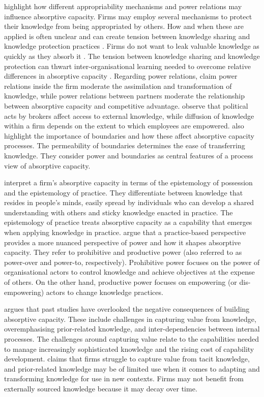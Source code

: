 \citet{todorova2007absorptive} highlight how different appropriability mechanisms and power relations may influence absorptive capacity.  Firms may employ several mechanisms to protect their knowledge from being appropriated by others. How and when these are applied is often unclear and can create tension between knowledge sharing and knowledge protection practices \citep{gama2019managing}. Firms do not want to leak valuable knowledge as quickly as they absorb it \citep{todorova2007absorptive}. The tension between knowledge sharing and knowledge protection can thwart inter-organisational learning needed to overcome relative differences in absorptive capacity \citep{dragsdahl2019perspective,gama2019managing}. Regarding power relations, \citet{todorova2007absorptive} claim power relations inside the firm moderate the assimilation and transformation of knowledge, while power relations between partners moderate the relationship between absorptive capacity and competitive advantage.  \citet{easterby2008absorptive} observe that political acts by brokers affect access to external knowledge, while diffusion of knowledge within a firm depends on the extent to which employees are empowered. \citet{easterby2008absorptive} also highlight the importance of boundaries and how these affect absorptive capacity processes. The permeability of boundaries determines the ease of transferring knowledge. They consider power and boundaries as central features of a process view of absorptive capacity. \medskip

\citet{marabelli2014knowing} interpret a firm's absorptive capacity in terms of the epistemology of possession and the epistemology of practice. They differentiate between knowledge that resides in people's minds, easily spread by individuals who can develop a shared understanding with others and sticky knowledge enacted in practice. The epistemology of practice treats absorptive capacity as a capability that emerges when applying knowledge in practice. \citet{marabelli2014knowing} argue that a practice-based perspective provides a more nuanced perspective of power and how it shapes absorptive capacity. They refer to prohibitive and productive power (also referred to as power-over and power-to, respectively). Prohibitive power focuses on the power of organisational actors to control knowledge and achieve objectives at the expense of others. On the other hand, productive power focuses on empowering (or dis-empowering) actors to change knowledge practices. \medskip

\citet {lichtenthaler2016absorptive} argues that past studies have overlooked the negative consequences of building absorptive capacity. These include challenges in capturing value from knowledge, overemphasising prior-related knowledge, and inter-dependencies between internal processes. The challenges around capturing value relate to the capabilities needed to manage increasingly sophisticated knowledge and the rising cost of capability development. \citet{lichtenthaler2016absorptive} claims that firms struggle to capture value from tacit knowledge, and prior-related knowledge may be of limited use when it comes to adapting and transforming knowledge for use in new contexts. Firms may not benefit from externally sourced knowledge because it may decay over time. \medskip

